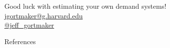 \documentclass[aspectratio=169,t,11pt,table]{beamer}
\begin{document}
\begin{frame}[c]{}
    \begin{center}
        Good luck with estimating your own demand systems! \\[\baselineskip]
        \href{mailto:jgortmaker@g.harvard.edu}{jgortmaker@g.harvard.edu} \\
        \href{https://twitter.com/jeff_gortmaker}{@jeff\_gortmaker}
    \end{center}
\end{frame}

\backupbegin

\begin{frame}{References}
    
\end{frame}

\backupend
\end{document}

